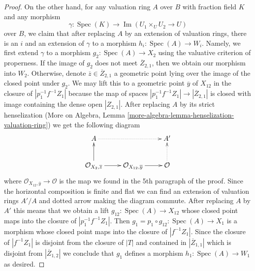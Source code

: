 \documentclass[10pt,a4paper]{amsart}
\theoremstyle{plain}
\theoremstyle{definition}
\theoremstyle{remark}
\numberwithin{equation}{subsection}
\def\Spec{\mathop{\mathrm{Spec}}}
\def\Im{\mathop{\mathrm{Im}}}
\begin{document}
\begin{proof}
\medskip\noindent
On the other hand, for any valuation ring $A$ over $B$ with
fraction field $K$ and any morphism
$$
\gamma : \Spec(K) \to \Im(U_1 \times_U U_2 \to U)
$$
over $B$, we claim that after replacing $A$ by an extension of valuation
rings, there is an $i$ and an extension of $\gamma$ to a morphism
$h_i : \Spec(A) \to W_i$. Namely, we first extend $\gamma$ to a
morphism $g_2 : \Spec(A) \to X_2$ using the valuative criterion of
properness. If the image of $g_2$ does not meet $\overline{Z}_{2, 1}$,
then we obtain our morphism into $W_2$.
Otherwise, denote $\overline{z} \in \overline{Z}_{2, 1}$ a geometric
point lying over the image of the closed point under $g_2$.
We may lift this to a geometric point $\overline{y}$ of $X_{12}$
in the closure of $|p_1^{-1}f^{-1}Z_1|$ because the map of
spaces $|p_1^{-1}f^{-1}Z_1| \to |\overline{Z}_{2, 1}|$ is closed
with image containing the dense open $|Z_{2, 1}|$. After replacing $A$
by its strict henselization
(More on Algebra, Lemma \ref{more-algebra-lemma-henselization-valuation-ring})
we get the following diagram
$$
\xymatrix{
A \ar@{..>}[rr] & & A' \\
\mathcal{O}_{X_2, \overline{z}} \ar[r] \ar[u] &
\mathcal{O}_{X_{12}, \overline{y}} \ar[r] &
\mathcal{O} \ar@{..>}[u]
}
$$
where $\mathcal{O}_{X_{12}, \overline{y}} \to \mathcal{O}$ is the
map we found in the 5th paragraph of the proof.
Since the horizontal composition is finite and flat we can find an
extension of valuation rings $A'/A$ and dotted arrow making the diagram
commute. After replacing $A$ by $A'$ this means that we obtain a lift
$g_{12} : \Spec(A) \to X_{12}$ whose closed point maps into
the closure of $|p_1^{-1}f^{-1}Z_1|$.
Then $g_1 = p_1 \circ g_{12} : \Spec(A) \to X_1$ is a morphism whose
closed point maps into the closure of $|f^{-1}Z_1|$. Since the closure
of $|f^{-1}Z_1|$ is disjoint from the closure of $|T|$ and contained in
$|\overline{Z}_{1, 1}|$ which is disjoint from $|\overline{Z}_{1, 2}|$
we conclude that $g_1$ defines a morphism $h_1 : \Spec(A) \to W_1$
as desired.


\end{proof}
\end{document}
